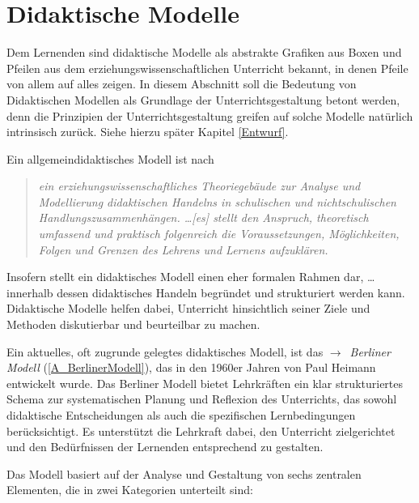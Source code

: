 \chapter{Didaktische Modelle}\label{DidMod}

Dem Lernenden sind didaktische Modelle als abstrakte Grafiken aus Boxen und Pfeilen aus dem erziehungswissenschaftlichen Unterricht bekannt, in denen Pfeile von allem auf alles zeigen. In diesem Abschnitt soll die Bedeutung von Didaktischen Modellen als Grundlage der Unterrichtsgestaltung betont werden, denn die Prinzipien der Unterrichtsgestaltung greifen auf solche Modelle nat\"{u}rlich intrinsisch zur\"{u}ck. Siehe hierzu sp\"{a}ter Kapitel \ref{Entwurf}.

\mip

Ein allgemeindidaktisches Modell ist nach \textcite{JankMeyer} \begin{quote}{\glqq}\emph{ein erziehungswissenschaftliches Theoriegeb\"{a}ude zur Analyse und Modellierung didaktischen Handelns in schulischen und nichtschulischen Handlungszusammenh\"{a}ngen. \dots [es] stellt den Anspruch, theoretisch umfassend und praktisch folgenreich die Voraussetzungen, M\"{o}glichkeiten, Folgen und Grenzen des Lehrens und Lernens aufzukl\"{a}ren.}{\grqq} \end{quote} Insofern stellt ein didaktisches Modell einen eher formalen Rahmen dar, {\glqq}\dots innerhalb dessen didaktisches Handeln begr\"{u}ndet und strukturiert werden kann.{\grqq} Didaktische Modelle helfen dabei, Unterricht hinsichtlich seiner Ziele und Methoden diskutierbar und beurteilbar zu machen.

\mip

Ein aktuelles, oft zugrunde gelegtes didaktisches Modell, ist das  $\to$~\emph{Berliner Modell} (\cref{A_BerlinerModell}), das in den 1960er Jahren von Paul Heimann entwickelt wurde.  Das Berliner Modell bietet Lehrkr\"{a}ften ein klar strukturiertes Schema zur systematischen Planung und Reflexion des Unterrichts, das sowohl didaktische Entscheidungen als auch die spezifischen Lernbedingungen ber\"{u}cksichtigt. Es unterst\"{u}tzt die Lehrkraft dabei, den Unterricht zielgerichtet und den Bed\"{u}rfnissen der Lernenden entsprechend zu gestalten.

\mip

Das Modell basiert auf der Analyse und Gestaltung von sechs zentralen Elementen, die in zwei Kategorien unterteilt sind:


